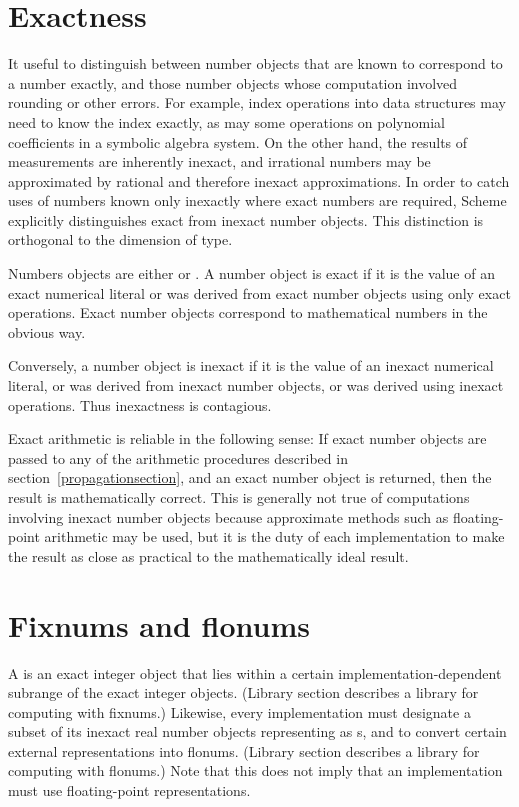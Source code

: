 \section{Exactness}
\label{exactly}

It useful to distinguish between number objects
that are known to correspond to a number exactly, and those number
objects whose computation involved rounding or other errors.  For
example, index operations into data structures may need to know the index
exactly, as may some operations on polynomial coefficients in a symbolic algebra
system.  On the other hand, the results of measurements are inherently
inexact, and irrational numbers may be approximated by rational and
therefore inexact approximations.  In order to catch uses of numbers
known only inexactly where exact numbers are required, Scheme
explicitly distinguishes exact from inexact number objects.  This
distinction is orthogonal to the dimension of type.

Numbers objects are either  or .  A
number object is exact if it is the value of an exact numerical
literal or was derived from exact number objects using only exact
operations.  Exact number objects correspond to mathematical numbers
in the obvious way.

Conversely, a number object is inexact if it is the value of an
inexact numerical literal, or was derived from inexact number objects,
or was derived using inexact operations.  Thus inexactness is
contagious.

Exact arithmetic is reliable in the following sense: If exact number
objects are passed to any of the arithmetic procedures described in
section~\ref{propagationsection}, and an exact number object is
returned, then the result is mathematically correct.  This is
generally not true of computations involving inexact number objects
because approximate methods such as floating-point arithmetic may be
used, but it is the duty of each implementation to make the result as
close as practical to the mathematically ideal result.

\section{Fixnums and flonums}

A  is an exact integer object that lies
within a certain implementation-dependent subrange of the
exact integer objects. (Library section  describes a
library for computing with fixnums.)
Likewise, every implementation must
designate a subset of its inexact real number objects representing as s, and
to convert certain external representations into flonums.  
(Library section  describes a library for
computing with flonums.)  Note that
this does not imply that an implementation must use
floating-point representations.

